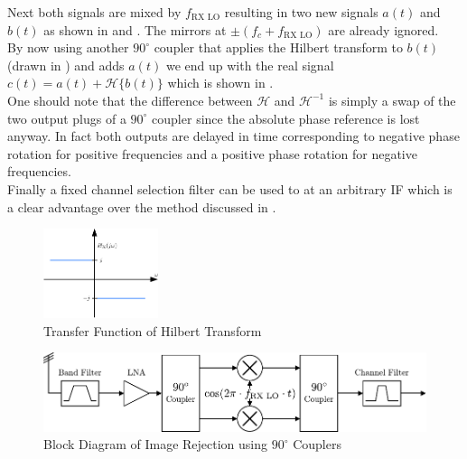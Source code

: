 Next both signals are mixed by $f_{\text{RX LO}}$ resulting in two new signals
$a(t)$ and $b(t)$ as shown in  and
.
The mirrors at $\pm (f_c + f_{\text{RX LO}})$ are already ignored. \\

By now using another $90^\circ$ coupler that applies the Hilbert transform
to $b(t)$ (drawn in )
and adds $a(t)$ we end up with the real signal
$c(t) = a(t) + \mathcal{H}\{b(t)\}$
which is shown in . \\

One should note that the difference between $\mathcal{H}$ and $\mathcal{H}^{-1}$
is simply a swap of the two output plugs of a $90^\circ$ coupler since
the absolute phase reference is lost anyway. In fact both outputs are delayed
in time corresponding to negative phase rotation for positive frequencies
and a positive phase rotation for negative frequencies. \\

Finally a fixed channel selection filter can be used to at an arbitrary \gls{IF}
which is a clear advantage over the method discussed in . \\

\begin{figure}[ht]
  \centering
  \includegraphics[width=0.3\textwidth]{figures/hilbert}
  \caption{Transfer Function of Hilbert Transform}
  \label{fig:hilbert}
\end{figure}

\begin{figure}[ht]
  \centering
  \includegraphics[width=\textwidth]{figures/rx_rf_1_bd}
  \caption{Block Diagram of Image Rejection using $90^\circ$ Couplers}
  \label{fig:rx_rf_0_bd}
\end{figure}

